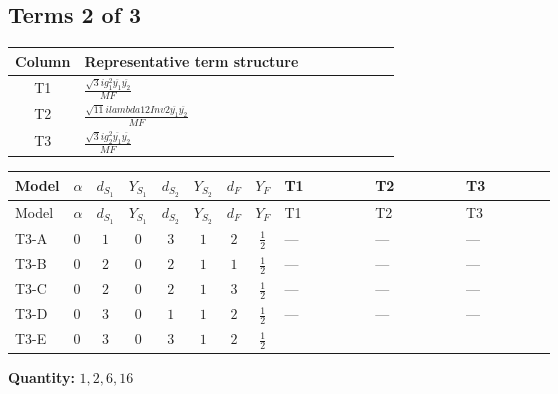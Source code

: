 \documentclass[8pt]{article}
\begin{document}
\begin{landscape}
\subsection*{Terms 2 of 3}
\begin{center}
\begin{tabular}{@{}c >{\raggedright\arraybackslash}p{0.82\linewidth}@{}}
\toprule
Column & Representative term structure \\
\midrule
T1 & \(\displaystyle \frac{\sqrt{3} i g_{1}^{2} \overline{y_{1}} \overline{y_{2}}}{MF}\) \\
\midrule
T2 & \(\displaystyle \frac{\sqrt{11} i lambda12Inv2 \overline{y_{1}} \overline{y_{2}}}{MF}\) \\
\midrule
T3 & \(\displaystyle \frac{\sqrt{3} i g_{2}^{2} \overline{y_{1}} \overline{y_{2}}}{MF}\) \\
\midrule
\bottomrule
\end{tabular}
\end{center}
\smallskip
\tiny
\begin{longtable}{@{}llcccccc >{\raggedright\arraybackslash}p{0.21\linewidth} >{\raggedright\arraybackslash}p{0.21\linewidth} >{\raggedright\arraybackslash}p{0.21\linewidth}@{}}
\toprule
Model & $\alpha$ & $d_{S_1}$ & $Y_{S_1}$ & $d_{S_2}$ & $Y_{S_2}$ & $d_F$ & $Y_F$ & T1 & T2 & T3 \\
\midrule
\endfirsthead
\toprule
Model & $\alpha$ & $d_{S_1}$ & $Y_{S_1}$ & $d_{S_2}$ & $Y_{S_2}$ & $d_F$ & $Y_F$ & T1 & T2 & T3 \\
\midrule
\endhead
T3-A & $0$ & $1$ & $0$ & $3$ & $1$ & $2$ & $\frac{1}{2}$ & --- & --- & --- \\
\midrule
T3-B & $0$ & $2$ & $0$ & $2$ & $1$ & $1$ & $\frac{1}{2}$ & --- & --- & --- \\
\midrule
T3-C & $0$ & $2$ & $0$ & $2$ & $1$ & $3$ & $\frac{1}{2}$ & --- & --- & --- \\
\midrule
T3-D & $0$ & $3$ & $0$ & $1$ & $1$ & $2$ & $\frac{1}{2}$ & --- & --- & --- \\
\midrule
T3-E & $0$ & $3$ & $0$ & $3$ & $1$ & $2$ & $\frac{1}{2}$ & \scriptsize\adjustbox{max width=\linewidth}{$\begin{gathered} \frac{\sqrt{3} i g_{1}^{2} \overline{y_{1}} \overline{y_{2}}}{8 MF}\end{gathered}$} & \scriptsize\adjustbox{max width=\linewidth}{$\begin{gathered} \frac{3 \sqrt{11} i lambda12Inv2 \overline{y_{1}} \overline{y_{2}}}{22 MF}\end{gathered}$} & \scriptsize\adjustbox{max width=\linewidth}{$\begin{gathered} \frac{15 \sqrt{3} i g_{2}^{2} \overline{y_{1}} \overline{y_{2}}}{8 MF}\end{gathered}$} \\
\midrule
\bottomrule
\end{longtable}
\clearpage
\noindent\textbf{Quantity: }$\mathrm{1,2,6,16}$\par\smallskip

\end{landscape}
\end{document}
